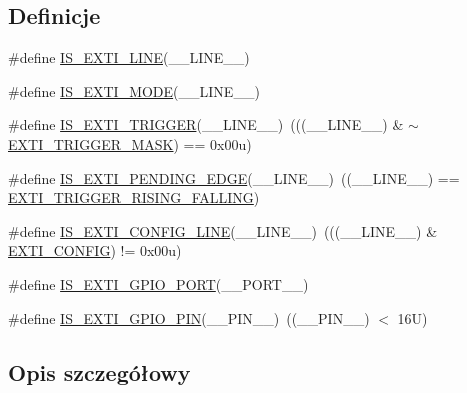 \subsection*{Definicje}
\begin{DoxyCompactItemize}
\item 
\#define \hyperlink{group___e_x_t_i___private___macros_gab9eb047b8a317ec5f38c9bfcca65744c}{I\+S\+\_\+\+E\+X\+T\+I\+\_\+\+L\+I\+NE}(\+\_\+\+\_\+\+L\+I\+N\+E\+\_\+\+\_\+)
\item 
\#define \hyperlink{group___e_x_t_i___private___macros_gaa8a0977af667f831424dcd75ecb6709b}{I\+S\+\_\+\+E\+X\+T\+I\+\_\+\+M\+O\+DE}(\+\_\+\+\_\+\+L\+I\+N\+E\+\_\+\+\_\+)
\item 
\#define \hyperlink{group___e_x_t_i___private___macros_ga0a4ff8a2705f40043db7c3e5d7cf0059}{I\+S\+\_\+\+E\+X\+T\+I\+\_\+\+T\+R\+I\+G\+G\+ER}(\+\_\+\+\_\+\+L\+I\+N\+E\+\_\+\+\_\+)~(((\+\_\+\+\_\+\+L\+I\+N\+E\+\_\+\+\_\+)  \& $\sim$\hyperlink{group___e_x_t_i___private___constants_ga3e14df666414849fd5a3907a96a2a892}{E\+X\+T\+I\+\_\+\+T\+R\+I\+G\+G\+E\+R\+\_\+\+M\+A\+SK}) == 0x00u)
\item 
\#define \hyperlink{group___e_x_t_i___private___macros_ga11d59f58f3608c79dc729205e6421e93}{I\+S\+\_\+\+E\+X\+T\+I\+\_\+\+P\+E\+N\+D\+I\+N\+G\+\_\+\+E\+D\+GE}(\+\_\+\+\_\+\+L\+I\+N\+E\+\_\+\+\_\+)~((\+\_\+\+\_\+\+L\+I\+N\+E\+\_\+\+\_\+) == \hyperlink{group___e_x_t_i___trigger_ga481cea6a2aafe107e5657b65887c81d5}{E\+X\+T\+I\+\_\+\+T\+R\+I\+G\+G\+E\+R\+\_\+\+R\+I\+S\+I\+N\+G\+\_\+\+F\+A\+L\+L\+I\+NG})
\item 
\#define \hyperlink{group___e_x_t_i___private___macros_ga74c5ff710e86a50aea20e3ba92cd51e1}{I\+S\+\_\+\+E\+X\+T\+I\+\_\+\+C\+O\+N\+F\+I\+G\+\_\+\+L\+I\+NE}(\+\_\+\+\_\+\+L\+I\+N\+E\+\_\+\+\_\+)~(((\+\_\+\+\_\+\+L\+I\+N\+E\+\_\+\+\_\+) \& \hyperlink{group___e_x_t_i___private___constants_ga6f245ca02e17c1798fe43a66ea5b7fa4}{E\+X\+T\+I\+\_\+\+C\+O\+N\+F\+IG}) != 0x00u)
\item 
\#define \hyperlink{group___e_x_t_i___private___macros_ga839c895e37f0e74052194d91ad68a3ae}{I\+S\+\_\+\+E\+X\+T\+I\+\_\+\+G\+P\+I\+O\+\_\+\+P\+O\+RT}(\+\_\+\+\_\+\+P\+O\+R\+T\+\_\+\+\_\+)
\item 
\#define \hyperlink{group___e_x_t_i___private___macros_ga82f191b2ea96948f302dc6c2108ea534}{I\+S\+\_\+\+E\+X\+T\+I\+\_\+\+G\+P\+I\+O\+\_\+\+P\+IN}(\+\_\+\+\_\+\+P\+I\+N\+\_\+\+\_\+)~((\+\_\+\+\_\+\+P\+I\+N\+\_\+\+\_\+) $<$ 16\+U)
\end{DoxyCompactItemize}


\subsection{Opis szczegółowy}


